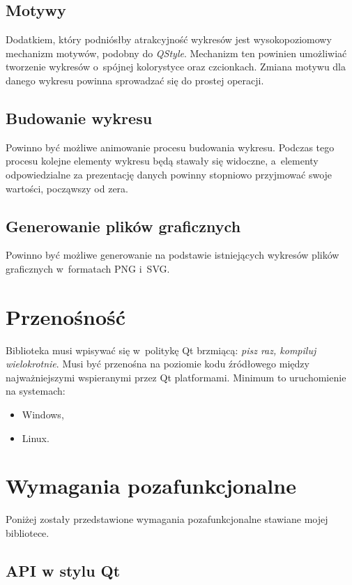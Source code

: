 \subsection{Motywy}
Dodatkiem, który podniósłby atrakcyjność wykresów jest wysokopoziomowy mechanizm motywów, podobny do \textit{QStyle}. Mechanizm ten powinien umożliwiać tworzenie wykresów o~spójnej kolorystyce oraz czcionkach. Zmiana motywu dla danego wykresu powinna sprowadzać się do prostej operacji.

\subsection{Budowanie wykresu}
Powinno być możliwe animowanie procesu budowania wykresu. Podczas tego procesu kolejne elementy wykresu będą stawały się widoczne, a~elementy odpowiedzialne za prezentację danych powinny stopniowo przyjmować swoje wartości, począwszy od zera.

\subsection{Generowanie plików graficznych}
Powinno być możliwe generowanie na podstawie istniejących wykresów plików graficznych  w~formatach PNG i~SVG.

\section{Przenośność}
Biblioteka musi wpisywać się w~politykę Qt brzmiącą: \textit{pisz raz, kompiluj wielokrotnie}. Musi być przenośna na poziomie kodu źródłowego między najważniejszymi wspieranymi przez Qt platformami.
Minimum to uruchomienie na systemach:
\begin{itemize}
\item{Windows,}
\item{Linux.}
\end{itemize}


\section{Wymagania pozafunkcjonalne}
Poniżej zostały przedstawione wymagania pozafunkcjonalne stawiane mojej bibliotece.

\subsection{API w stylu Qt}

